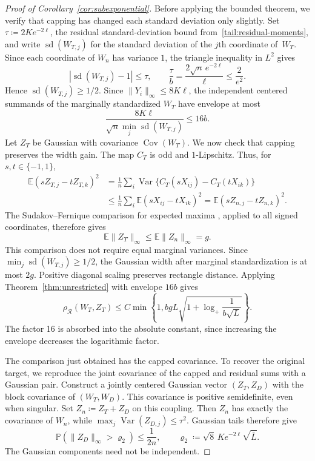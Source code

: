\documentclass[11pt,letterpaper]{article}
\newcommand{\vSix}[1]{{\color{magenta}#1}}
\newenvironment{vSixBlock}{\color{magenta}}{}
\theoremstyle{remark}
\newcommand{\E}{\mathbb E}
\newcommand{\Pp}{\mathbb P}
\newcommand{\Cov}{\operatorname{Cov}}
\newcommand{\Var}{\operatorname{Var}}
\newcommand{\rh}{\rho_{\mathcal R}}
\begin{document}
\begin{proof}[Proof of Corollary~\ref{cor:subexponential}]
Before applying the bounded theorem, we verify that \vSix{capping} has
changed each standard deviation only slightly. Set
\(\tau\coloneqq 2Ke^{-2\ell}\), the residual standard-deviation
bound from~\eqref{tail:residual-moments}, and write \(\operatorname{sd}(W_{T,j})\) for the
standard deviation of the \(j\)th coordinate of~\(W_T\).
Since each coordinate of \(W_n\) has variance \(1\), the triangle
inequality in \(L^2\) gives
\[
 |\operatorname{sd}(W_{T,j})-1|\le\tau,
 \qquad \frac\tau b=\frac{2\sqrt n\,e^{-2\ell}}\ell
 \le\frac2{e^2}.
\]
Hence \(\operatorname{sd}(W_{T,j})\ge1/2\). Since \(\|Y_i\|_\infty\le8K\ell\), the
independent centered summands of the marginally standardized \(W_T\)
have envelope at most
\[
 \frac{8K\ell}{\sqrt n\min_j\operatorname{sd}(W_{T,j})}\le16b.
\]
\begin{vSixBlock}
Let \(Z_T\) be Gaussian with covariance \(\Cov(W_T)\).
We now check that capping preserves the width gain. The map \(C_T\)
is odd and \(1\)-Lipschitz. Thus, for \(s,t\in\{-1,1\}\),
\begin{align*}
 \E(sZ_{T,j}-tZ_{T,k})^2
 &=\frac1n\sum_i\Var\{C_T(sX_{ij})-C_T(tX_{ik})\}\\
 &\le\frac1n\sum_i\E(sX_{ij}-tX_{ik})^2
 =\E(sZ_{n,j}-tZ_{n,k})^2.
\end{align*}
The Sudakov--Fernique comparison for expected maxima
\cite[Theorem~2.6.5]{AdlerTaylorWorsley2015}, applied to all signed
coordinates, therefore gives
\begin{equation}\label{tail:width-contraction}
 \E\|Z_T\|_\infty\le\E\|Z_n\|_\infty=g.
\end{equation}
This comparison does not require equal marginal variances.
Since \(\min_j\operatorname{sd}(W_{T,j})\ge1/2\), the Gaussian
width after marginal standardization is at most \(2g\).
Positive diagonal scaling preserves rectangle distance. Applying
Theorem~\ref{thm:unrestricted} with envelope \(16b\) gives
\begin{equation}
 \rh(W_T,Z_T)\le C\min\left\{1,
 bgL\sqrt{1+\log_+\frac1{b\sqrt L}}\right\}.
 \label{tail:bounded-comparison}
\end{equation}
The factor 16 is absorbed into the absolute constant, since increasing
the envelope decreases the logarithmic factor.
\end{vSixBlock}

The comparison just obtained has the \vSix{capped} covariance. To recover
the original target, we reproduce the joint covariance of the \vSix{capped}
and residual sums with a Gaussian pair. Construct a jointly centered Gaussian vector \((Z_T,Z_D)\) with the
block covariance of \((W_T,W_D)\). This covariance is positive
semidefinite, even when singular. Set \(Z_n\coloneqq Z_T+Z_D\) on this coupling.
Then \(Z_n\) has exactly the covariance of \(W_n\), while
\(\max_j\Var(Z_{D,j})\le\tau^2\). Gaussian tails therefore give
\begin{equation}
 \Pp(\|Z_D\|_\infty>\varrho_2)\le\frac1{2n},\qquad
 \varrho_2\coloneqq \sqrt8\,Ke^{-2\ell}\sqrt{\bar L}.
 \label{tail:Gaussian-coupling}
\end{equation}
The Gaussian components need not be independent.


\end{proof}
\end{document}
